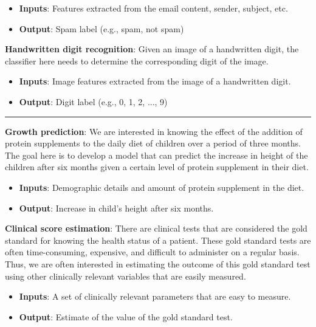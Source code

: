 \begin{boxedstuff}
\begin{example}
        \begin{itemize}
            \item \textbf{Inputs}: Features extracted from the email content, sender, subject, etc.
            \item \textbf{Output}: Spam label (e.g., spam, not spam)
        \end{itemize}
    \end{example}
    \begin{example}
        \textbf{Handwritten digit recognition}: Given an image of a handwritten digit, the classifier here needs to determine the corresponding digit of the image.
        \begin{itemize}
            \item \textbf{Inputs}: Image features extracted from the image of a handwritten digit.
            \item \textbf{Output}: Digit label (e.g., 0, 1, 2, ..., 9)
        \end{itemize}
    \end{example}

    \vspace{4mm}
    \hrule
    \begin{example}
        \textbf{Growth prediction}: We are interested in knowing the effect of the addition of protein supplements to the daily diet of children over a period of three months. The goal here is to develop a model that can predict the increase in height of the children after six months given a certain level of protein supplement in their diet.
        \begin{itemize}
            \item \textbf{Inputs}: Demographic details and amount of protein supplement in the diet.
            \item \textbf{Output}: Increase in child's height after six months.
        \end{itemize}
    \end{example}
    \begin{example}
        \textbf{Clinical score estimation}: There are clinical tests that are considered the gold standard for knowing the health status of a patient. These gold standard tests are often time-consuming, expensive, and difficult to administer on a regular basis. Thus, we are often interested in estimating the outcome of this gold standard test using other clinically relevant variables that are easily measured.
        \begin{itemize}
            \item \textbf{Inputs}: A set of clinically relevant parameters that are easy to measure.
            \item \textbf{Output}: Estimate of the value of the gold standard test.
        \end{itemize}
    \end{example}
\end{boxedstuff}

